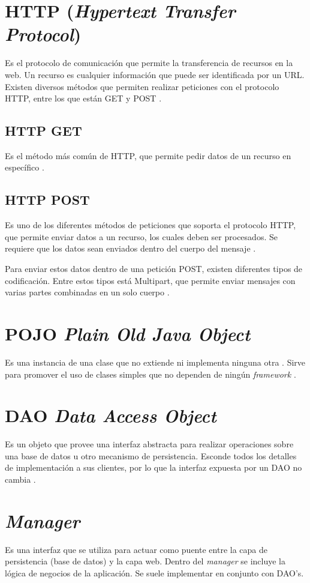 \section{HTTP (\textit{Hypertext Transfer Protocol})}\label{HTTP}

Es el protocolo de comunicación que permite la transferencia de recursos en la web. Un recurso es cualquier información que puede ser identificada por un URL. Existen diversos métodos que permiten realizar peticiones con el protocolo HTTP, entre los que están GET y POST \cite{HTTP2}.

\subsection{HTTP GET}

Es el método más común de HTTP, que permite pedir datos de un recurso en específico \cite{HTTP3}. 

\subsection{HTTP POST}

Es uno de los diferentes métodos de peticiones que soporta el protocolo HTTP, que permite enviar datos a un recurso, los cuales deben ser procesados. Se requiere que los datos sean enviados dentro del cuerpo del mensaje \cite{HTTP3}.

Para enviar estos datos dentro de una petición POST, existen diferentes tipos de codificación. Entre estos tipos está Multipart, que permite enviar mensajes con varias partes combinadas en un solo cuerpo \cite{HTTP1}.

\section{POJO \textit{Plain Old Java Object}}

Es una instancia de una clase que no extiende ni implementa ninguna otra \cite{POJO0}. Sirve para promover el uso de clases simples que no dependen de ningún \textit{framework} \cite{POJO1}.

\section{DAO \textit{Data Access Object}}

Es un objeto que provee una interfaz abstracta para realizar operaciones sobre una base de datos u otro mecanismo de persistencia. Esconde todos los detalles de implementación a sus clientes, por lo que la interfaz expuesta por un DAO no cambia \cite{DAO0}.

\section{\textit{Manager}}

Es una interfaz que se utiliza para actuar como puente entre la capa de persistencia (base de datos) y la capa web. Dentro del \textit{manager} se incluye la lógica de negocios de la aplicación. Se suele implementar en conjunto con DAO's. \cite{MNG0}